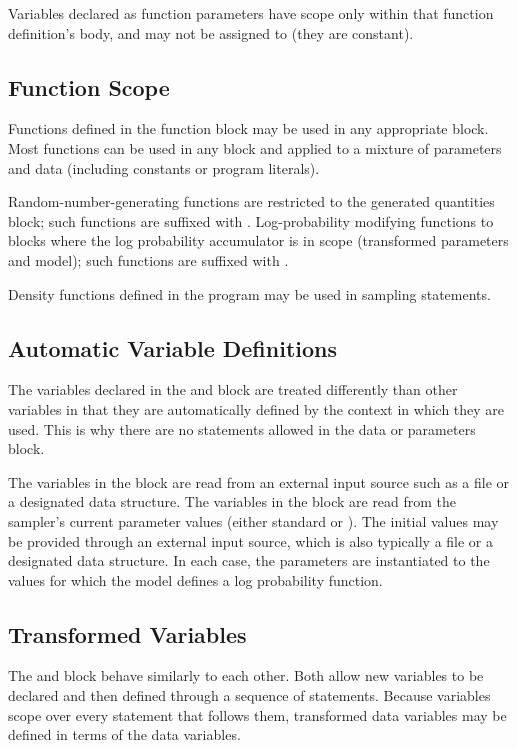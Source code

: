 Variables declared as function parameters have scope only within that
function definition's body, and may not be assigned to (they are
constant).

\subsection{Function Scope}

Functions defined in the function block may be used in any appropriate
block.  Most functions can be used in any block and applied to a
mixture of parameters and data (including constants or program
literals).

Random-number-generating functions are restricted to the generated
quantities block; such functions are suffixed with .
Log-probability modifying functions to blocks where the log
probability accumulator is in scope (transformed parameters and
model); such functions are suffixed with .

Density functions defined in the program may be used in sampling
statements.

\subsection{Automatic Variable Definitions}

The variables declared in the  and  block
are treated differently than other variables in that they are
automatically defined by the context in which they are used.  This is
why there are no statements allowed in the data or parameters block.

The variables in the  block are read from an external input
source such as a file or a designated \R data structure.  The
variables in the  block are read from the sampler's
current parameter values (either standard \HMC or \NUTS).  The initial
values may be provided through an external input source, which is also
typically a file or a designated \R data structure.  In each case, the
parameters are instantiated to the values for which the model defines
a log probability function.

\subsection{Transformed Variables}

The  and  block
behave similarly to each other.  Both allow new variables to be
declared and then defined through a sequence of statements.  Because
variables scope over every statement that follows them, transformed
data variables may be defined in terms of the data variables.

